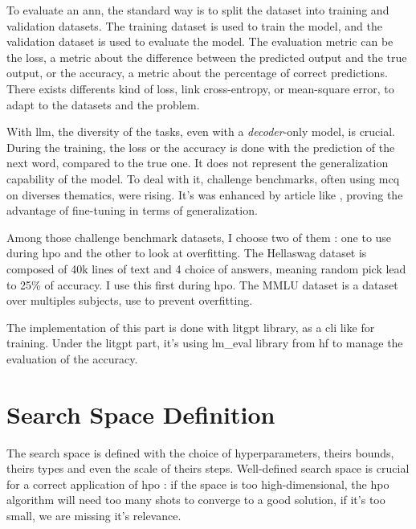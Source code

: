 To evaluate an \acrshort{ann}, the standard way is to split the dataset into training and validation datasets. The training dataset is used to train the model, and the validation dataset is used to evaluate the model. The evaluation metric can be the loss, a metric about the difference between the predicted output and the true output, or the accuracy, a metric about the percentage of correct predictions. There exists differents kind of loss, link cross-entropy, or mean-square error, to adapt to the datasets and the problem.

With \acrshort{llm}, the diversity of the tasks, even with a \textit{decoder}-only model, is crucial. During the training, the loss or the accuracy is done with the prediction of the next word, compared to the true one. It does not represent the generalization capability of the model. To deal with it, challenge benchmarks, often using \acrfull{mcq} on diverses thematics, were rising. It's was enhanced by article like \cite{wei_finetuned_2022}, proving the advantage of fine-tuning in terms of generalization. 

Among those challenge benchmark datasets, I choose two of them : one to use during \acrshort{hpo} and the other to look at overfitting. The Hellaswag \cite{zellers_hellaswag_2019} dataset is composed of 40k lines of text and 4 choice of answers, meaning random pick lead to 25\% of accuracy. I use this first during \acrshort{hpo}. The MMLU dataset \cite{hendrycks_measuring_2021} is a dataset over multiples subjects, use to prevent overfitting.

The implementation of this part is done with \gls{litgpt} library, as a \acrshort{cli} like for training. Under the \gls{litgpt} part, it's using lm\_eval library from \gls{hf} to manage the evaluation of the accuracy. 



\section{Search Space Definition}
\label{sec:search_space}

The search space is defined with the choice of hyperparameters, theirs bounds, theirs types and even the scale of theirs steps.  Well-defined search space is crucial for a correct application of \acrshort{hpo} : if the space is too high-dimensional, the \acrshort{hpo} algorithm will need too many shots to converge to a good solution, if it's too small, we are missing it's relevance. 

